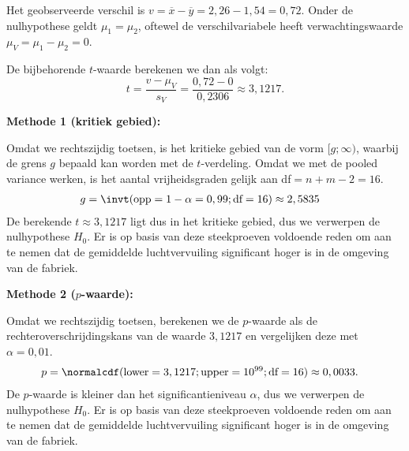 {    Het geobserveerde verschil is $v = \overline{x} - \overline{y} = 2,26 - 1,54 = 0,72$.
    Onder de nulhypothese geldt $\mu_1 = \mu_2$, oftewel de verschilvariabele heeft verwachtingswaarde $\mu_V = \mu_1 - \mu_2 = 0$.

    De bijbehorende $t$-waarde berekenen we dan als volgt:
    \[
        t = \frac{v - \mu_V}{s_V} = \frac{0,72 - 0}{0,2306} \approx 3,1217.
    \]

    {\bfseries Methode 1 (kritiek gebied):}
    
    Omdat we rechtszijdig toetsen, is het kritieke gebied van de vorm $[g; \infty)$, waarbij de grens $g$ bepaald kan worden met de $t$-verdeling.
    Omdat we met de pooled variance werken, is het aantal vrijheidsgraden gelijk aan df$=n+m-2=16$.
    \begin{align*}
        g &= \invt(\text{opp}=1-\alpha = 0,99; \text{df}=16) \approx 2,5835
    \end{align*}
    De berekende $t \approx 3,1217$ ligt dus in het kritieke gebied, dus we verwerpen de nulhypothese $H_0$.
    Er is op basis van deze steekproeven voldoende reden om aan te nemen dat de gemiddelde luchtvervuiling significant hoger is in de omgeving van de fabriek.

    {\bfseries Methode 2 ($p$-waarde):}

    Omdat we rechtszijdig toetsen, berekenen we de $p$-waarde als de rechteroverschrijdingskans van de waarde $3,1217$ en vergelijken deze met $\alpha = 0,01$.
    \begin{align*}
        p &= \normalcdf(\text{lower}=3,1217; \text{upper}=10^{99}; \text{df}=16) \approx 0,0033.
    \end{align*}
    De $p$-waarde is kleiner dan het significantieniveau $\alpha$, dus we verwerpen de nulhypothese $H_0$.
    Er is op basis van deze steekproeven voldoende reden om aan te nemen dat de gemiddelde luchtvervuiling significant hoger is in de omgeving van de fabriek.
}